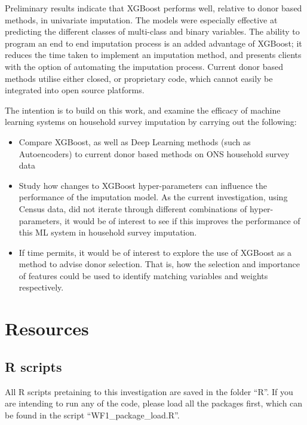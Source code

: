 \documentclass[]{book}
\providecommand{\tightlist}{%
  \setlength{\itemsep}{0pt}\setlength{\parskip}{0pt}}
\begin{document}
Preliminary results indicate that XGBoost performs well, relative to
donor based methods, in univariate imputation. The models were
especially effective at predicting the different classes of multi-class
and binary variables. The ability to program an end to end imputation
process is an added advantage of XGBoost; it reduces the time taken to
implement an imputation method, and presents clients with the option of
automating the imputation process. Current donor based methods utilise
either closed, or proprietary code, which cannot easily be integrated
into open source platforms.

The intention is to build on this work, and examine the efficacy of
machine learning systems on household survey imputation by carrying out
the following:

\begin{itemize}
\tightlist
\item
  Compare XGBoost, as well as Deep Learning methods (such as
  Autoencoders) to current donor based methods on ONS household survey
  data\\
\item
  Study how changes to XGBoost hyper-parameters can influence the
  performance of the imputation model. As the current investigation,
  using Census data, did not iterate through different combinations of
  hyper-parameters, it would be of interest to see if this improves the
  performance of this ML system in household survey imputation.\\
\item
  If time permits, it would be of interest to explore the use of XGBoost
  as a method to advise donor selection. That is, how the selection and
  importance of features could be used to identify matching variables
  and weights respectively.
\end{itemize}

\chapter{Resources}\label{resources}

\section{R scripts}\label{r-scripts}

All R scripts pretaining to this investigation are saved in the folder
``R''. If you are intending to run any of the code, please load all the
packages first, which can be found in the script
``WF1\_package\_load.R''.
\end{document}

